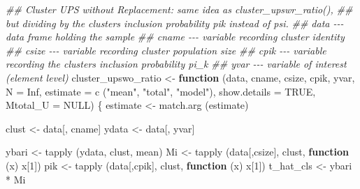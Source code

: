 \documentclass[
  letterpaper,
  DIV=11,
  numbers=noendperiod]{scrreprt}
\newenvironment{Shaded}{\begin{snugshade}}{\end{snugshade}}
\newcommand{\AttributeTok}[1]{\textcolor[rgb]{0.40,0.45,0.13}{#1}}
\newcommand{\ConstantTok}[1]{\textcolor[rgb]{0.56,0.35,0.01}{#1}}
\newcommand{\ControlFlowTok}[1]{\textcolor[rgb]{0.00,0.23,0.31}{\textbf{#1}}}
\newcommand{\DecValTok}[1]{\textcolor[rgb]{0.68,0.00,0.00}{#1}}
\newcommand{\DocumentationTok}[1]{\textcolor[rgb]{0.37,0.37,0.37}{\textit{#1}}}
\newcommand{\FunctionTok}[1]{\textcolor[rgb]{0.28,0.35,0.67}{#1}}
\newcommand{\NormalTok}[1]{\textcolor[rgb]{0.00,0.23,0.31}{#1}}
\newcommand{\OtherTok}[1]{\textcolor[rgb]{0.00,0.23,0.31}{#1}}
\newcommand{\SpecialCharTok}[1]{\textcolor[rgb]{0.37,0.37,0.37}{#1}}
\newcommand{\StringTok}[1]{\textcolor[rgb]{0.13,0.47,0.30}{#1}}
\renewcommand{\[}{\begin{equation}}
\renewcommand{\]}{\end{equation}}
\begin{document}
\begin{Shaded}
\begin{Highlighting}[]
\DocumentationTok{\#\# Cluster UPS without Replacement: same idea as cluster\_upswr\_ratio(),}
\DocumentationTok{\#\# but dividing by the cluster\textquotesingle{}s inclusion probability pik instead of psi.}
\DocumentationTok{\#\# data {-}{-}{-} data frame holding the sample}
\DocumentationTok{\#\# cname {-}{-}{-} variable recording cluster identity}
\DocumentationTok{\#\# csize {-}{-}{-} variable recording cluster population size}
\DocumentationTok{\#\# cpik {-}{-}{-} variable recording the cluster\textquotesingle{}s inclusion probability pi\_k}
\DocumentationTok{\#\# yvar {-}{-}{-} variable of interest (element level)}
\NormalTok{cluster\_upswo\_ratio }\OtherTok{\textless{}{-}} \ControlFlowTok{function}\NormalTok{ (data, cname, csize, cpik, yvar, }\AttributeTok{N =} \ConstantTok{Inf}\NormalTok{,}
                                  \AttributeTok{estimate =} \FunctionTok{c}\NormalTok{ (}\StringTok{"mean"}\NormalTok{, }\StringTok{"total"}\NormalTok{, }\StringTok{"model"}\NormalTok{),}
                                  \AttributeTok{show.details =} \ConstantTok{TRUE}\NormalTok{, }\AttributeTok{Mtotal\_U =} \ConstantTok{NULL}\NormalTok{)}
\NormalTok{\{}
\NormalTok{  estimate }\OtherTok{\textless{}{-}} \FunctionTok{match.arg}\NormalTok{ (estimate)}

\NormalTok{  clust }\OtherTok{\textless{}{-}}\NormalTok{ data[, cname]}
\NormalTok{  ydata }\OtherTok{\textless{}{-}}\NormalTok{ data[, yvar]}

\NormalTok{  ybari }\OtherTok{\textless{}{-}} \FunctionTok{tapply}\NormalTok{ (ydata, clust, mean)}
\NormalTok{  Mi }\OtherTok{\textless{}{-}} \FunctionTok{tapply}\NormalTok{ (data[,csize], clust, }\ControlFlowTok{function}\NormalTok{ (x) x[}\DecValTok{1}\NormalTok{])}
\NormalTok{  pik }\OtherTok{\textless{}{-}} \FunctionTok{tapply}\NormalTok{ (data[,cpik], clust, }\ControlFlowTok{function}\NormalTok{ (x) x[}\DecValTok{1}\NormalTok{])}
\NormalTok{  t\_hat\_cls }\OtherTok{\textless{}{-}}\NormalTok{ ybari }\SpecialCharTok{*}\NormalTok{ Mi}


\end{Highlighting}
\end{Shaded}
\end{document}
